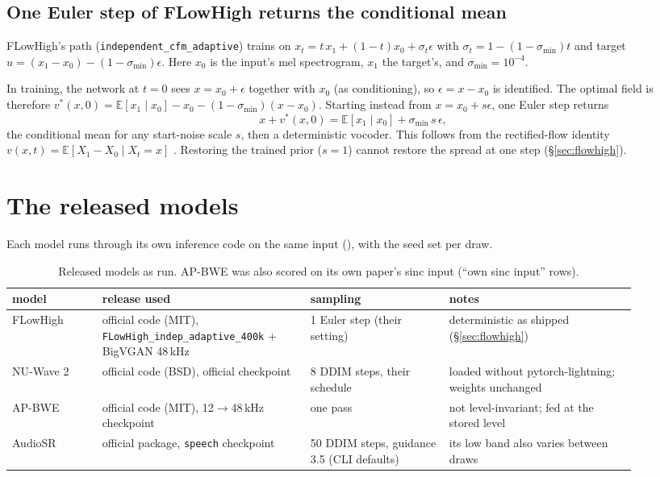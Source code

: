\documentclass[10pt,letterpaper]{article}
\newcommand{\file}[1]{\path{#1}}
\newcommand{\E}{\mathbb{E}}
\begin{document}
\subsection{One Euler step of FLowHigh returns the conditional mean}\label{sec:flowhigh-deriv}
FLowHigh's path (\texttt{independent\_cfm\_adaptive}) trains on $x_t=t\,x_1+(1-t)x_0+\sigma_t\epsilon$ with
$\sigma_t=1-(1-\sigma_{\min})t$ and target $u=(x_1-x_0)-(1-\sigma_{\min})\epsilon$. Here $x_0$ is the input's mel
spectrogram, $x_1$ the target's, and $\sigma_{\min}=10^{-4}$.

In training, the network at $t=0$ sees $x=x_0+\epsilon$ together with $x_0$ (as conditioning), so
$\epsilon=x-x_0$ is identified. The optimal field is therefore
$v^*(x,0)=\E[x_1\mid x_0]-x_0-(1-\sigma_{\min})(x-x_0)$. Starting instead from $x=x_0+s\epsilon$, one Euler step
returns
\begin{equation}
x+v^*(x,0)=\E[x_1\mid x_0]+\sigma_{\min}\,s\,\epsilon ,
\end{equation}
the conditional mean for any start-noise scale $s$, then a deterministic vocoder. This follows from the
rectified-flow identity $v(x,t)=\E[X_1-X_0\mid X_t=x]$ \cite{liu2022}. Restoring the trained prior ($s=1$) cannot
restore the spread at one step (\S\ref{sec:flowhigh}).

\section{The released models}\label{sec:released}

Each model runs through its own inference code on the same input (\file{code/sota/run_models.py}), with the
seed set per draw.

\begin{table}[H]\small\centering
\begin{tabular}{p{0.13\linewidth}p{0.3\linewidth}p{0.2\linewidth}p{0.27\linewidth}}
\toprule
model & release used & sampling & notes \\
\midrule
FLowHigh & official code (MIT), \texttt{FLowHigh\_indep\_adaptive\_400k} + BigVGAN 48\,kHz & 1 Euler step (their setting) & deterministic as shipped (\S\ref{sec:flowhigh}) \\
NU-Wave 2 & official code (BSD), official checkpoint & 8 DDIM steps, their schedule & loaded without pytorch-lightning; weights unchanged \\
AP-BWE & official code (MIT), 12$\to$48\,kHz checkpoint & one pass & not level-invariant; fed at the stored level \\
AudioSR & official package, \texttt{speech} checkpoint & 50 DDIM steps, guidance 3.5 (CLI defaults) & its low band also varies between draws \\
\bottomrule
\end{tabular}
\caption{Released models as run. AP-BWE was also scored on its own paper's sinc input (``own sinc input'' rows).}
\end{table}
\end{document}
